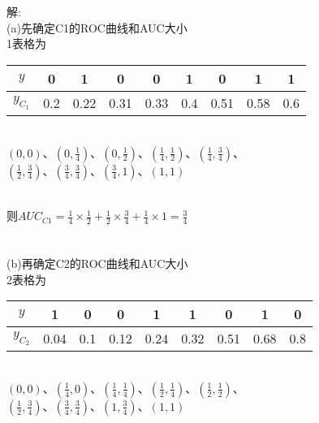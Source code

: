 \documentclass{article}
\begin{document}
	\\\\
解:\\
\indent(a)先确定C1的ROC曲线和AUC大小\\
1表格为
\begin{table}[htbp]
		\centering
		\begin{tabular}{c|cccccccc}
			\hline
			$y$ & 0 & 1 & 0 & 0 & 1 & 0 & 1 & 1\\
			\hline
			$y_{C_1}$ & 0.2 & 0.22 & 0.31 & 0.33 & 0.4 & 0.51 & 0.58 & 0.6\\
			\hline
		\end{tabular}
	\end{table}
\\
$(0,0)$、$(0,\frac{1}{4})$、$(0,\frac{1}{2})$、$(\frac{1}{4},\frac{1}{2})$、$(\frac{1}{4},\frac{3}{4})$、\\
\indent$(\frac{1}{2},\frac{3}{4})$、$(\frac{3}{4},\frac{3}{4})$、$(\frac{3}{4},1)$、$(1,1)$\\
\begin{figure}[htb]         \end{figure} \\
\indent 则$AUC_{C1}=\frac{1}{4}\times\frac{1}{2}+\frac{1}{2}\times\frac{3}{4}+\frac{1}{4}\times1=\frac{3}{4}$
\\\\\\
\indent(b)再确定C2的ROC曲线和AUC大小\\
2表格为
\begin{table}[htbp]
		\centering
		\begin{tabular}{c|cccccccc}
			\hline
			$y$ & 1 & 0 & 0 & 1 & 1 & 0 & 1 & 0\\
			\hline
			$y_{C_2}$ & 0.04 & 0.1 & 0.12 & 0.24 & 0.32 & 0.51 & 0.68 & 0.8\\
			\hline
		\end{tabular}
	\end{table}
\\
$(0,0)$、$(\frac{1}{4},0)$、$(\frac{1}{4},\frac{1}{4})$、$(\frac{1}{2},\frac{1}{4})$、$(\frac{1}{2},\frac{1}{2})$、\\
\indent$(\frac{1}{2},\frac{3}{4})$、$(\frac{3}{4},\frac{3}{4})$、$(1,\frac{3}{4})$、$(1,1)$\\
\end{document}
